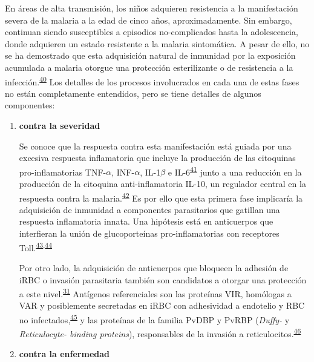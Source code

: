 \documentclass[]{article}
\begin{document}
\begin{enumerate}
\begin{enumerate}
    En áreas de alta transmisión, los niños adquieren resistencia a la
    manifestación severa de la malaria a la edad de cinco años,
    aproximadamente. Sin embargo, continuan siendo susceptibles a
    episodios no-complicados hasta la adolescencia, donde adquieren un
    estado resistente a la malaria sintomática. A pesar de ello, no se
    ha demostrado que esta adquisición natural de inmunidad por la
    exposición acumulada a malaria otorgue una protección esterilizante
    o de resistencia a la
    infección.\textsuperscript{\protect\hyperlink{ref-crompton2014rev}{40}}
    Los detalles de los procesos involucrados en cada una de estas fases
    no están completamente entendidos, pero se tiene detalles de algunos
    componentes:

    \begin{enumerate}
    \def\labelenumiii{\arabic{enumiii}.}
    \item
      \textbf{contra la severidad}

      Se conoce que la respuesta contra esta manifestación está guiada
      por una excesiva respuesta inflamatoria que incluye la producción
      de las citoquinas pro-inflamatorias TNF-\(\alpha\),
      INF-\(\alpha\), IL-1\(\beta\) e
      IL-6\textsuperscript{\protect\hyperlink{ref-baird2013}{41}} junto
      a una reducción en la producción de la citoquina anti-inflamatoria
      IL-10, un regulador central en la respuesta contra la
      malaria.\textsuperscript{\protect\hyperlink{ref-jagannathan2014}{42}}
      Es por ello que esta primera fase implicaría la adquisición de
      inmunidad a componentes parasitarios que gatillan una respuesta
      inflamatoria innata. Una hipótesis está en anticuerpos que
      interfieran la unión de glucoporteínas pro-inflamatorias con
      receptores
      Toll.\textsuperscript{\protect\hyperlink{ref-schofield2006toll}{43},\protect\hyperlink{ref-coban2005toll}{44}}

      Por otro lado, la adquisición de anticuerpos que bloqueen la
      adhesión de iRBC o invasión parasitaria también son candidatos a
      otorgar una protección a este
      nivel.\textsuperscript{\protect\hyperlink{ref-wassmer2015}{31}}
      Antígenos referenciales son las proteínas VIR, homólogas a VAR y
      posiblemente secretadas en iRBC con adhesividad a endotelio y RBC
      no
      infectados,\textsuperscript{\protect\hyperlink{ref-portillo2001vir}{45}}
      y las proteínas de la familia PvDBP y PvRBP (\emph{Duffy-} y
      \emph{Reticulocyte- binding proteins}), responsables de la
      invasión a
      reticulocitos.\textsuperscript{\protect\hyperlink{ref-galinski1992rbp}{46}}
      \newpage
    \item
      \textbf{contra la enfermedad}


\end{enumerate}
\end{enumerate}
\end{enumerate}
\end{document}
